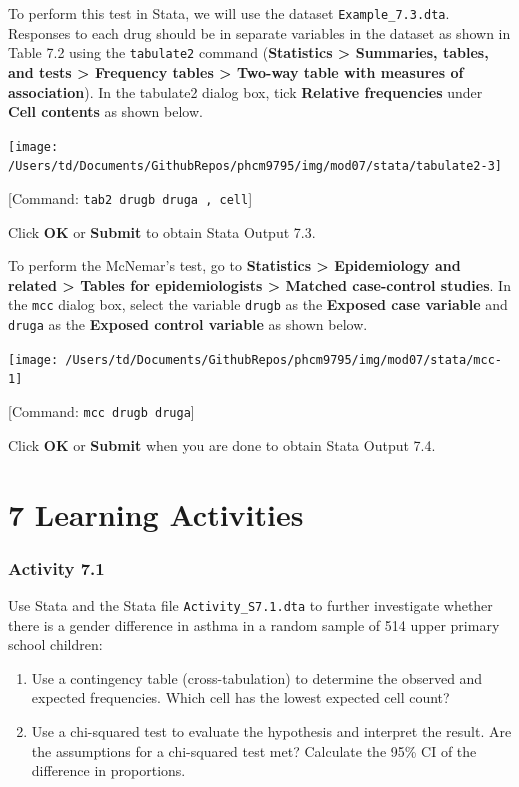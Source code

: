 \documentclass[
]{memoir}
\providecommand{\tightlist}{%
  \setlength{\itemsep}{0pt}\setlength{\parskip}{0pt}}
\begin{document}
To perform this test in Stata, we will use the dataset \texttt{Example\_7.3.dta}. Responses to each drug should be in separate variables in the dataset as shown in Table 7.2 using the \texttt{tabulate2} command (\textbf{Statistics \textgreater{} Summaries, tables, and tests \textgreater{} Frequency tables \textgreater{} Two-way table with measures of association}). In the tabulate2 dialog box, tick \textbf{Relative frequencies} under \textbf{Cell contents} as shown below.

\texttt{[image: /Users/td/Documents/GithubRepos/phcm9795/img/mod07/stata/tabulate2-3]}

{[}Command: \texttt{tab2\ drugb\ druga\ ,\ cell}{]}

Click \textbf{OK} or \textbf{Submit} to obtain Stata Output 7.3.

To perform the McNemar's test, go to \textbf{Statistics \textgreater{} Epidemiology and related \textgreater{} Tables for epidemiologists \textgreater{} Matched case-control studies}. In the \texttt{mcc} dialog box, select the variable \texttt{drugb} as the \textbf{Exposed case variable} and \texttt{druga} as the \textbf{Exposed control variable} as shown below.

\texttt{[image: /Users/td/Documents/GithubRepos/phcm9795/img/mod07/stata/mcc-1]}

{[}Command: \texttt{mcc\ drugb\ druga}{]}

Click \textbf{OK} or \textbf{Submit} when you are done to obtain Stata Output 7.4.

\hypertarget{learning-activities-6}{%
\chapter*{\texorpdfstring{\textbf{7} Learning Activities}{7 Learning Activities}}\label{learning-activities-6}}

\hypertarget{activity-7.1}{%
\subsection*{Activity 7.1}\label{activity-7.1}}

Use Stata and the Stata file \texttt{Activity\_S7.1.dta} to further investigate whether there is a gender difference in asthma in a random sample of 514 upper primary school children:

\begin{enumerate}
\def\labelenumi{\alph{enumi})}
\tightlist
\item
  Use a contingency table (cross-tabulation) to determine the observed and expected frequencies. Which cell has the lowest expected cell count?
\item
  Use a chi-squared test to evaluate the hypothesis and interpret the result. Are the assumptions for a chi-squared test met? Calculate the 95\% CI of the difference in proportions.
\end{enumerate}
\end{document}
